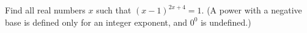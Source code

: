 Find all real numbers $x$ such that $(x-1)^{2x+4}=1$. (A power with a negative base is defined only for an integer exponent, and $0^0$ is undefined.)
